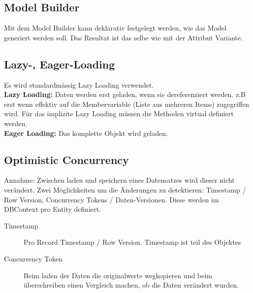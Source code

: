 \subsection{Model Builder}
Mit dem Model Builder kann deklarativ festgelegt werden, wie das Model generiert werden soll. Das Resultat ist das selbe wie mit der Attribut Variante.

\subsection{Lazy-, Eager-Loading}
Es wird standardmässig Lazy Loading verwendet. \\
\textbf{Lazy Loading:} Daten werden erst geladen, wenn sie dereferenziert werden. z.B erst wenn effektiv auf die Membervariable (Liste aus mehreren Items) zugegriffen wird. Für das implizite Lazy Loading müssen die Methoden virtual definiert werden. \\
\textbf{Eager Loading:} Das komplette Objekt wird geladen.



\subsection{Optimistic Concurrency}
Annahme: Zwischen laden und speichern eines Datensatzes wird dieser nicht verändert. Zwei Möglichkeiten um die Änderungen zu detektieren: Timestamp / Row Version, Concurrency Tokens / Daten-Versionen. Diese werden im DBContext pro Entity definiert.

\begin{description}
  \item[Timestamp] Pro Record Timestamp / Row Version. Timestamp ist teil des Objektes
  \item[Concurrency Token] Beim laden der Daten die originalwerte wegkopieren und beim überschreiben einen Vergleich machen, ob die Daten verändert wurden.
\end{description}


\pagebreak